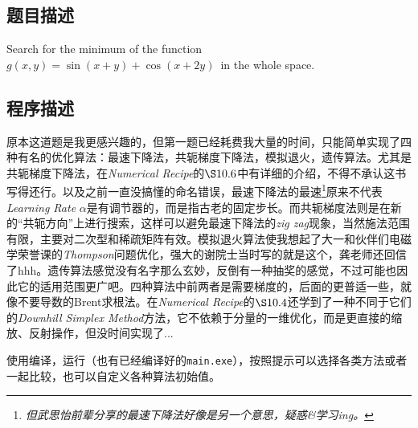 \subsection{题目描述}
Search for the minimum of the function \boldmath\( g(x, y) = \sin(x + y) + \cos(x + 2y) \)\unboldmath\ in the whole space.
\subsection{程序描述}
原本这道题是我更感兴趣的，但第一题已经耗费我大量的时间，只能简单实现了四种有名的优化算法：最速下降法，共轭梯度下降法，模拟退火，遗传算法。尤其是共轭梯度下降法，在\textit{Numerical Recipe}的$\S 10.6$中有详细的介绍，不得不承认这书写得还行。以及之前一直没搞懂的命名错误，最速下降法的最速\footnote{\textit{但武思怡前辈分享的最速下降法好像是另一个意思，疑惑\&学习ing。}}原来不代表\textit{Learning Rate} \( \alpha\)是有调节器的，而是指古老的固定步长。而共轭梯度法则是在新的“共轭方向”上进行搜索，这样可以避免最速下降法的\textit{zig zag}现象，当然施法范围有限，主要对二次型和稀疏矩阵有效。模拟退火算法使我想起了大一和伙伴们电磁学荣誉课的\textit{Thompson}问题优化，强大的谢院士当时写的就是这个，龚老师还回信了hhh。遗传算法感觉没有名字那么玄妙，反倒有一种抽奖的感觉，不过可能也因此它的适用范围更广吧。四种算法中前两者是需要梯度的，后面的更普适一些，就像不要导数的Brent求根法。在\textit{Numerical Recipe}的$\S 10.4$还学到了一种不同于它们的\textit{Downhill Simplex Method}方法，它不依赖于分量的一维优化，而是更直接的缩放、反射操作，但没时间实现了...




使用编译，运行（也有已经编译好的\texttt{main.exe}），按照提示可以选择各类方法或者一起比较，也可以自定义各种算法初始值。
